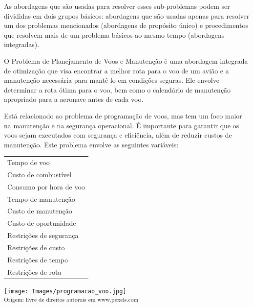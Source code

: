 \documentclass{amsart}
\begin{document}
As abordagens que são usadas para resolver esses sub-problemas podem ser divididas em dois grupos básicos: abordagens que são usadas apenas para resolver um dos problemas mencionados (abordagens de propósito único) e procedimentos que resolvem mais de um problema básicos ao mesmo tempo (abordagens integradas).

O Problema de Planejamento de Voos e Manutenção é uma abordagem integrada de otimização que visa encontrar a melhor rota para o voo de um avião e a manutenção necessária para mantê-lo em condições seguras. Ele envolve determinar a rota ótima para o voo, bem como o calendário de manutenção apropriado para a aeronave antes de cada voo.

Está relacionado ao problema de programação de voos, mas tem um foco maior na manutenção e na segurança operacional. É importante para garantir que os voos sejam executados com segurança e eficiência, além de reduzir custos de manutenção. Este problema envolve as seguintes variáveis:

\vspace{0.5cm}

\begin{minipage}[h]{.98\linewidth}
	\begin{minipage}[t]{0.25\linewidth}
		\begin{tabular}{l}
		Tempo de voo\\
		Custo de combustível\\
		Consumo por hora de voo\\
		Tempo de manutenção\\
		Custo de manutenção\\
		Custo de oportunidade\\
		Restrições de segurança\\
		Restrições de custo\\
		Restrições de tempo\\
		Restrições de rota\\
		\end{tabular}
	\end{minipage}
	\hfill
	\begin{minipage}[t]{0.72\linewidth}
		\vspace{-2ex}
		\texttt{[image: Images/programacao\_voo.jpg]}\\
		\small\textsuperscript{Origem: livre de direitos autorais em www.pexels.com}
	\end{minipage}
\end{minipage}
\end{document}
